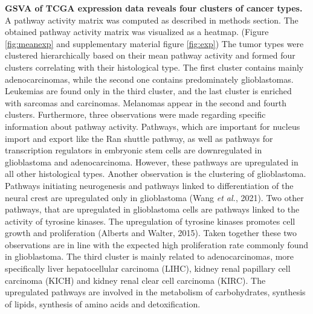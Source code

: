 \documentclass[
  11pt,
  parskip,
  oneside]{scrreprt}
\begin{document}
\textbf{GSVA of TCGA expression data reveals four clusters of cancer
types.} A pathway activity matrix was computed as described in methods
section. The obtained pathway activity matrix was visualized as a
heatmap. (Figure \ref{fig:meanexp} and supplementary material figure
\ref{fig:exp}) The tumor types were clustered hierarchically based on
their mean pathway activity and formed four clusters correlating with
their histological type. The first cluster contains mainly
adenocarcinomas, while the second one contains predominately
glioblastomas. Leukemias are found only in the third cluster, and the
last cluster is enriched with sarcomas and carcinomas. Melanomas appear
in the second and fourth clusters. Furthermore, three observations were
made regarding specific information about pathway activity. Pathways,
which are important for nucleus import and export like the Ran shuttle
pathway, as well as pathways for transcription regulators in embryonic
stem cells are downregulated in glioblastoma and adenocarcinoma.
However, these pathways are upregulated in all other histological types.
Another observation is the clustering of glioblastoma. Pathways
initiating neurogenesis and pathways linked to differentiation of the
neural crest are upregulated only in glioblastoma (Wang \emph{et al.},
2021). Two other pathways, that are upregulated in glioblastoma cells
are pathways linked to the activity of tyrosine kinases. The
upregulation of tyrosine kinases promotes cell growth and proliferation
(Alberts and Walter, 2015). Taken together these two observations are in
line with the expected high proliferation rate commonly found in
glioblastoma. The third cluster is mainly related to adenocarcinomas,
more specifically liver hepatocellular carcinoma (LIHC), kidney renal
papillary cell carcinoma (KICH) and kidney renal clear cell carcinoma
(KIRC). The upregulated pathways are involved in the metabolism of
carbohydrates, synthesis of lipids, synthesis of amino acids and
detoxification.
\end{document}
